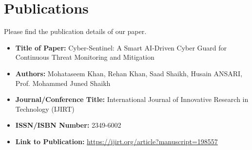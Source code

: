\chapter*{Publications}
Please find the publication details of our paper.

\begin{itemize}
	\item \textbf{Title of Paper:} Cyber-Sentinel: A Smart AI-Driven Cyber Guard for Continuous Threat
	Monitoring and Mitigation
	\item \textbf{Authors:} Mohataseem Khan, Rehan Khan, Saad Shaikh, Husain ANSARI, Prof. Mohammed Juned Shaikh
	\item \textbf{Journal/Conference Title:} International Journal of Innovative Research in Technology (IJIRT)
	\item \textbf{ISSN/ISBN Number:} 2349-6002
	\item \textbf{Link to Publication:} \url{https://ijirt.org/article?manuscript=198557}
	
\end{itemize}





